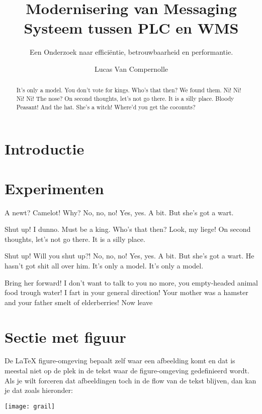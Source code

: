 \documentclass[a0,portrait]{hogent-poster}
\title{Modernisering van Messaging Systeem
tussen PLC en WMS}
\subtitle{Een Onderzoek
naar efficiëntie, betrouwbaarheid en
performantie.}
\author{Lucas Van Compernolle}
\begin{document}
\maketitle

\begin{abstract}
It's only a model.
You don't vote for kings. Who's that then? We found them. Ni! Ni! Ni! Ni!
The nose? On second thoughts, let's not go there. It is a silly place. Bloody Peasant! And the hat. She's a witch! Where'd you get the coconuts?
\end{abstract}

\begin{multicols}{2} %

\section{Introductie}



\section{Experimenten}

A newt? Camelot! Why? No, no, no! Yes, yes. A bit. But she's got a wart.

Shut up! I dunno. Must be a king. Who's that then? Look, my liege! On second thoughts, let's not go there. It is a silly place.

Shut up! Will you shut up?! No, no, no! Yes, yes. A bit. But she's got a wart. He hasn't got shit all over him. It's only a model. It's only a model.

Bring her forward! I don't want to talk to you no more, you empty-headed animal food trough water! I fart in your general direction! Your mother was a hamster and your father smelt of elderberries! Now leave 

\section{Sectie met figuur}

De {\LaTeX} figure-omgeving bepaalt zelf waar een afbeelding komt en dat is meestal niet op de plek in de tekst waar de figure-omgeving gedefinieerd wordt. Als je wilt forceren dat afbeeldingen toch in de flow van de tekst blijven, dan kan je dat zoals hieronder:

\begin{center}
  \captionsetup{type=figure}
  \texttt{[image: grail]}
\end{center}


\end{multicols}
\end{document}
